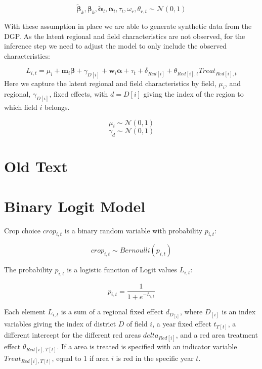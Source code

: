 \documentclass{article}
\begin{document}
\begin{equation} 
    \tilde{\mathbf{\beta}}_k, \mathbf{\beta}_k, \tilde{\mathbf{\alpha}}_l,\mathbf{\alpha}_l, \tau_{t}, \omega_{r},\theta_{r,t}  \sim \mathcal{N}(0,1)
\end{equation}


With these assumption in place we are able to generate synthetic data from the
DGP. As the latent regional and field characteristics are not observed, for the 
inference step we need to adjust the model to only include the observed 
characteristics:

\begin{equation}  
    L_{i,t} = \mu_{i} +  \mathbf{m}_i \mathbf{\beta} + \gamma_{D[i]} + \mathbf{w}_i \mathbf{\alpha} +  \tau_{t} + \delta_{Red[i]} + \theta_{Red[i],t} Treat_{Red[i],t}
\end{equation}
Here we capture the latent regional and field characteristics by field, $\mu_{i}$, 
and regional, $\gamma_{D[i]}$, fixed effects, with $d=D[i]$ giving the index of the region
to which field $i$ belongs. 

\begin{equation} 
    \mu_{i}  \sim \mathcal{N}(0,1)
\end{equation}
\begin{equation} 
    \gamma_{d} \sim \mathcal{N}(0,1)
\end{equation}


\section{Old Text}

\section{Binary Logit Model}

Crop choice $crop_{i,t}$ is a binary random variable with
probability $p_{i,t}$:

\begin{equation}  
    crop_{i,t} \sim Bernoulli(p_{i,t})
\end{equation}

The probability $p_{i,t}$ is a logistic 
function of Logit values $L_{i,t}$:

\begin{equation}  
    p_{i,t} = \frac{1}{1 + e^{-L_{i,t}}}
\end{equation}


Each element $L_{i,t}$ is a sum of a regional fixed effect
$d_{D_{[i]}}$, where $D_{[i]}$ is an index variables giving the index of district $D$ 
of field $i$, a year fixed effect $t_{T[t]}$, a different intercept 
for the different red areas $delta_{Red[i]}$, and a red area 
treatment effect $\theta_{Red[i],T[t]}$. If a area is treated is specified 
with an indicator variable $Treat_{Red[i],T[t]}$, equal to 1 if area $i$ 
is red in the specific year $t$.
\end{document}
